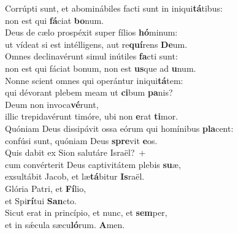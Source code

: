 \evenverse Corrúpti sunt, et abominábiles facti sunt in iniqui\textbf{tá}tibus:~\*\\
\evenverse non est qui \textbf{fá}ciat \textbf{bo}num.\\
\oddverse Deus de cælo prospéxit super fílios \textbf{hó}minum:~\*\\
\oddverse ut vídeat si est intélligens, aut re\textbf{quí}rens \textbf{De}um.\\
\evenverse Omnes declinavérunt simul inútiles \textbf{fa}cti sunt:~\*\\
\evenverse non est qui fáciat bonum, non est \textbf{us}que ad \textbf{u}num.\\
\oddverse Nonne scient omnes qui operántur iniqui\textbf{tá}tem:~\*\\
\oddverse qui dévorant plebem meam ut \textbf{ci}bum \textbf{pa}nis?\\
\evenverse Deum non invoca\textbf{vé}runt,~\*\\
\evenverse illic trepidavérunt timóre, ubi non \textbf{e}rat \textbf{ti}mor.\\
\oddverse Quóniam Deus dissipávit ossa eórum qui homínibus \textbf{pla}cent:~\*\\
\oddverse confúsi sunt, quóniam Deus \textbf{spre}vit \textbf{e}os.\\
\evenverse Quis dabit ex Sion salutáre Israël?~+\\
\evenverse  cum convérterit Deus captivitátem plebis \textbf{su}æ,~\*\\
\evenverse exsultábit Jacob, et læ\textbf{tá}bitur \textbf{Is}raël.\\
\oddverse Glória Patri, et \textbf{Fí}lio,~\*\\
\oddverse et Spi\textbf{rí}tui \textbf{San}cto.\\
\evenverse Sicut erat in princípio, et nunc, et \textbf{sem}per,~\*\\
\evenverse et in sǽcula sæcu\textbf{ló}rum. \textbf{A}men.\\
